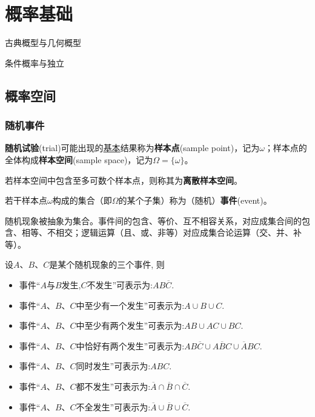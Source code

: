 \chapter{概率基础}\label{chap:probability_space}

\begin{introduction}[考试重点]
    \item 古典概型与几何概型
    \item 条件概率与独立
\end{introduction}

\section{概率空间}

\subsection{随机事件}

\begin{definition}[样本空间]
    \textbf{随机试验}(trial)可能出现的\underline{基本}结果称为\textbf{样本点}(sample point)，记为$\omega$；样本点的全体构成\textbf{样本空间}(sample space)，记为$\Omega=\{ \omega \}$。
\end{definition}

\begin{definition}[离散样本空间]
    若样本空间中包含至多可数个样本点，则称其为\textbf{离散样本空间}。
\end{definition}

\begin{definition}[事件的古典定义]
    若干样本点$\omega$构成的集合（即$\Omega$的某个子集）称为（随机）\textbf{事件}(event)。
\end{definition}

随机现象被抽象为集合。事件间的包含、等价、互不相容关系，对应成集合间的包含、相等、不相交；逻辑运算（且、或、非等）对应成集合论运算（交、并、补等）。

\begin{example}
    设$A$、$B$、$C$是某个随机现象的三个事件, 则
    \begin{itemize}
        \item 事件“$A$与$B$发生,$C$不发生”可表示为:$AB\overline{C}$.
        \item 事件“$A$、$B$、$C$中至少有一个发生”可表示为:$A \cup B \cup C$.
        \item 事件“$A$、$B$、$C$中至少有两个发生”可表示为:$AB \cup AC \cup BC$.
        \item 事件“$A$、$B$、$C$中恰好有两个发生”可表示为:$AB\overline{C} \cup A\overline{B}C \cup \overline{A}BC$.
        \item 事件“$A$、$B$、$C$同时发生”可表示为:$ABC$.
        \item 事件“$A$、$B$、$C$都不发生”可表示为:$\overline{A} \cap \overline{B} \cap \overline{C}$.
        \item 事件“$A$、$B$、$C$不全发生”可表示为:$\overline{A} \cup \overline{B} \cup \overline{C}$.
    \end{itemize}
\end{example}


